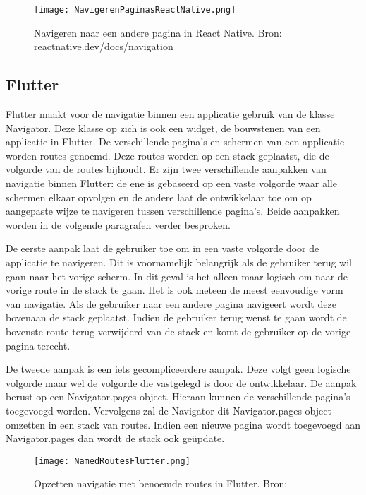 \begin{figure}
    \texttt{[image: NavigerenPaginasReactNative.png]}
    \caption{Navigeren naar een andere pagina in React Native. Bron: reactnative.dev/docs/navigation}
    \label{fig:navigerenReactNative}
\end{figure}

\subsection{Flutter}
\label{subsubsec:navigatieFlutter}

Flutter maakt voor de navigatie binnen een applicatie gebruik van de klasse Navigator. Deze klasse op zich is ook een widget, de bouwstenen van een applicatie in Flutter. De verschillende pagina's en schermen van een applicatie worden routes genoemd. Deze routes worden op een stack geplaatst, die de volgorde van de routes bijhoudt. Er zijn twee verschillende aanpakken van navigatie binnen Flutter: de ene is gebaseerd op een vaste volgorde waar alle schermen elkaar opvolgen en de andere laat de ontwikkelaar toe om op aangepaste wijze te navigeren tussen verschillende pagina's. Beide aanpakken worden in de volgende paragrafen verder besproken. 

De eerste aanpak laat de gebruiker toe om in een vaste volgorde door de applicatie te navigeren. Dit is voornamelijk belangrijk als de gebruiker terug wil gaan naar het vorige scherm. In dit geval is het alleen maar logisch om naar de vorige route in de stack te gaan. Het is ook meteen de meest eenvoudige vorm van navigatie. Als de gebruiker naar een andere pagina navigeert wordt deze bovenaan de stack geplaatst. Indien de gebruiker terug wenst te gaan wordt de bovenste route terug verwijderd van de stack en komt de gebruiker op de vorige pagina terecht.

De tweede aanpak is een iets gecompliceerdere aanpak. Deze volgt geen logische volgorde maar wel de volgorde die vastgelegd is door de ontwikkelaar. De aanpak berust op een Navigator.pages object. Hieraan kunnen de verschillende pagina's toegevoegd worden. Vervolgens zal de Navigator dit Navigator.pages object omzetten in een stack van routes. Indien een nieuwe pagina wordt toegevoegd aan Navigator.pages dan wordt de stack ook geüpdate. 

\begin{figure}
    \texttt{[image: NamedRoutesFlutter.png]}
    \caption{Opzetten navigatie met benoemde routes in Flutter. Bron: \textcite{Flutter.dev2020}}
    \label{fig:namedRoutesFlutter}
\end{figure}

